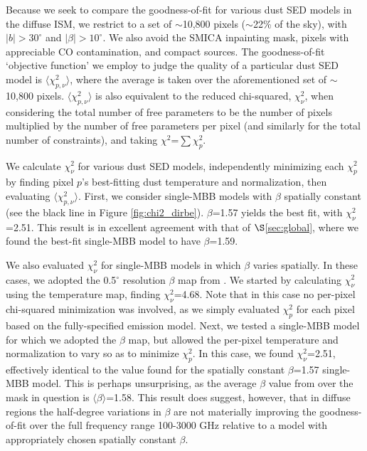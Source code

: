 \documentclass{emulateapj}
\begin{document}
Because we seek to compare the goodness-of-fit for various dust SED models in 
the diffuse ISM, we restrict to a set of $\sim$10,800 pixels ($\sim$22\% of the
sky), with $|b|>30^{\circ}$ and $|\beta|>10^{\circ}$. We also avoid the SMICA 
inpainting mask, pixels with appreciable CO contamination, and compact sources.
The goodness-of-fit `objective function' we employ to judge the quality of 
a particular dust SED model is $\langle \chi^2_{p, \nu} \rangle$, where the 
average is taken over the aforementioned set of $\sim$10,800 pixels. 
$\langle \chi_{p, \nu}^2 \rangle$ is also equivalent to the reduced 
chi-squared, $\chi^2_{\nu}$, when considering the total number of free 
parameters to be the number of pixels multiplied by the number of free 
parameters per pixel (and similarly for the total number of constraints), and
taking $\chi^2$=$\sum\chi^2_{p}$.

We calculate $\chi^2_{\nu}$ for various dust SED models, independently 
minimizing each $\chi^2_p$ by finding pixel $p$'s best-fitting dust 
temperature and normalization, then evaluating 
$\langle \chi_{p, \nu}^2 \rangle$. First, we consider single-MBB models with 
$\beta$ spatially constant (see the black line in Figure \ref{fig:chi2_dirbe}).
$\beta$=1.57 yields the best fit, with $\chi^2_{\nu}$=2.51. This result is in 
excellent agreement with that of $\S$\ref{sec:global}, where we found the 
best-fit single-MBB model to have $\beta$=1.59. 

We also evaluated $\chi^2_{\nu}$ for single-MBB models in which $\beta$ varies 
spatially. In these cases, we adopted the 0.5$^{\circ}$ resolution $\beta$ map 
from \cite{planckdust}. We started by calculating $\chi^2_{\nu}$ using the 
\cite{planckdust} temperature map, finding $\chi^2_{\nu}$=4.68. Note that in 
this case no per-pixel chi-squared minimization was involved, as we simply 
evaluated $\chi^2_{p}$ for each pixel based on the fully-specified 
\cite{planckdust} emission model. Next, we tested a single-MBB model for which 
we adopted the \cite{planckdust} $\beta$ map, but allowed the per-pixel 
temperature and normalization to vary so as to minimize $\chi^2_p$. In this 
case, we found $\chi^2_{\nu}$=2.51, effectively identical to the value found 
for the spatially constant $\beta$=1.57 single-MBB model. This is perhaps 
unsurprising, as the average $\beta$ value from \cite{planckdust} over the mask
in question is $\langle\beta\rangle$=1.58. This result does suggest, however, 
that in diffuse regions the half-degree variations in $\beta$ are not 
materially improving the goodness-of-fit over the full frequency range 100-3000
GHz relative to a model with appropriately chosen spatially constant $\beta$.
\end{document}
